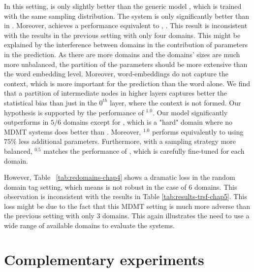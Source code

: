 In this setting,  is only slightly better than the generic model , which is trained with the same sampling distribution. The system is only significantly better than  in . Moreover,  achieves a performance equivalent to , . This result is inconsistent with the results in the previous setting with only four domains. This might be explained by the interference between domains in the contribution of parameters in the prediction. As there are more domains and the domains' sizes are much more unbalanced, the partition of the parameters should be more extensive than the word embedding level. Moreover, word-embeddings do not capture the context, which is more important for the prediction than the word alone. We find that a partition of intermediate nodes in higher layers captures better the statistical bias than just in the $0^{th}$ layer, where the context is not formed. Our hypothesis is supported by the performance of $^{1.0}$. Our model significantly outperforms  in $5/6$ domains except for , which is a "hard" domain where no MDMT systems does better than . Moreover, $^{1.0}$ performs equivalently to  using $75\%$ less additional parameters. Furthermore, with a sampling strategy more balanced, $^{0.5}$ matches the performance of , which is carefully fine-tuned for each domain.

However, Table ~\ref{tab:redomains-chap4} shows a dramatic loss in the random domain tag setting, which means  is not robust in the case of 6 domains. This observation is inconsistent with the results in Table \ref{tab:results-trsf-chap5}. This loss might be due to the fact that this MDMT setting is much more adverse than the previous setting with only 3 domains. This again illustrates the need to use a wide range of available domains to evaluate the systems.

\section{Complementary experiments\label{sec:Discussion-chap5}}
